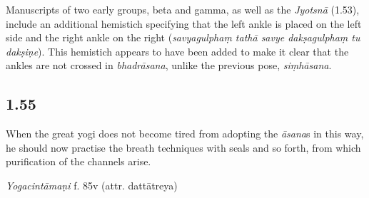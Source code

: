 \begin{ekdosis}
\begin{philcomm}[hp01_053]
Manuscripts of two early groups, beta and gamma, as well as the \emph{Jyotsnā} (1.53), include an additional hemistich specifying that the left ankle is placed on the left side and the right ankle on the right (\emph{savyagulphaṃ tathā savye dakṣagulphaṃ tu dakṣiṇe}). This hemistich appears to have been added to make it clear that the ankles are not crossed in \emph{bhadrāsana}, unlike the previous pose, \emph{siṃhāsana}.


\end{philcomm}





\subsection*{1.55}
\begin{translation}[hp01_055]
When the great yogi does not become tired from adopting the \emph{āsana}s in this way, he should now practise the breath techniques with seals and so forth, from which purification of the channels arise.
\end{translation}


\begin{testimonia}[hp01_055]
\emph{Yogacintāmaṇi} f. 85v (attr. dattātreya)

\begin{versinnote}
\end{versinnote}


\end{testimonia}
\end{ekdosis}
